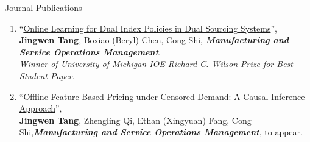 \documentclass{resume}
\begin{document}
\begin{rSection}{Journal Publications}
\begin{enumerate}
    \item ``\href{https://pubsonline.informs.org/doi/10.1287/msom.2022.0323}{Online Learning for Dual Index Policies in Dual Sourcing Systems}'', \\ \textbf{Jingwen Tang}, Boxiao (Beryl) Chen, Cong Shi, \emph{\textbf{Manufacturing and Service Operations Management}}. \\
    {\it Winner of University of Michigan IOE Richard C. Wilson Prize for Best Student Paper.}
  
  \item ``\href{https://papers.ssrn.com/sol3/papers.cfm?abstract_id=4040305}{Offline Feature-Based Pricing under Censored Demand: A Causal Inference Approach}'', \\\textbf{Jingwen Tang}, Zhengling Qi, Ethan (Xingyuan) Fang, Cong Shi,\emph{\textbf{Manufacturing and Service Operations Management}}, to appear.
\end{enumerate}
\end{rSection}
\end{document}
